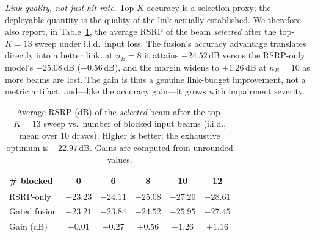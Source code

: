 \documentclass[conference]{IEEEtran}
\begin{document}
\emph{Link quality, not just hit rate.} Top-$K$ accuracy is a selection proxy;
the deployable quantity is the quality of the link actually established. We
therefore also report, in Table~\ref{tab:blockrsrp}, the average RSRP of the beam
\emph{selected} after the top-$K{=}13$ sweep under i.i.d.\ input loss. The fusion's
accuracy advantage translates directly into a better link: at $n_B{=}8$ it
attains $-24.52$\,dB versus the RSRP-only model's $-25.08$\,dB ($+0.56$\,dB), and
the margin widens to $+1.26$\,dB at $n_B{=}10$ as more beams are lost. The gain is
thus a genuine link-budget improvement, not a metric artifact, and---like the
accuracy gain---it grows with impairment severity.

\begin{table}[t]
\centering
\caption{Average RSRP (dB) of the \emph{selected} beam after the top-$K{=}13$
sweep vs.\ number of blocked input beams (i.i.d., mean over 10 draws). Higher is
better; the exhaustive optimum is $-22.97$\,dB. Gains are computed from
unrounded values.}
\label{tab:blockrsrp}
\begin{tabular}{@{}lccccc@{}}
\toprule
\# blocked & 0 & 6 & 8 & 10 & 12 \\
\midrule
RSRP-only    & $-23.23$ & $-24.11$ & $-25.08$ & $-27.20$ & $-28.61$ \\
Gated fusion & $-23.21$ & $-23.84$ & $-24.52$ & $-25.95$ & $-27.45$ \\
Gain (dB)    & $+0.01$  & $+0.27$  & $+0.56$  & $+1.26$  & $+1.16$  \\
\bottomrule
\end{tabular}
\end{table}
\end{document}
